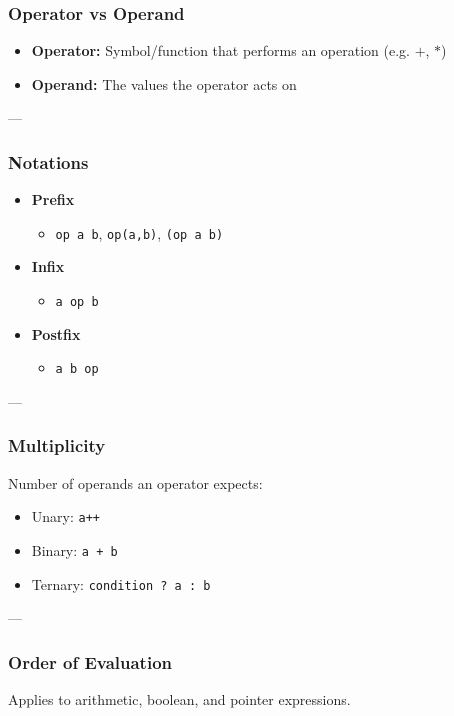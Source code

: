 \documentclass{article}
\begin{document}
\subsubsection{Operator vs Operand}
\begin{itemize}
  \item \textbf{Operator:} Symbol/function that performs an operation (e.g. $+$, $*$)
  \item \textbf{Operand:} The values the operator acts on
\end{itemize}

---

\subsubsection{Notations}

\begin{itemize}
  \item \textbf{Prefix}
  \begin{itemize}
    \item \texttt{op a b}, \texttt{op(a,b)}, \texttt{(op a b)}
  \end{itemize}
  
  \item \textbf{Infix}
  \begin{itemize}
    \item \texttt{a op b}
  \end{itemize}
  
  \item \textbf{Postfix}
  \begin{itemize}
    \item \texttt{a b op}
  \end{itemize}
\end{itemize}

---

\subsubsection{Multiplicity}
Number of operands an operator expects:
\begin{itemize}
  \item Unary: \texttt{a++}
  \item Binary: \texttt{a + b}
  \item Ternary: \texttt{condition ? a : b}
\end{itemize}

---

\subsubsection{Order of Evaluation}
Applies to arithmetic, boolean, and pointer expressions.
\end{document}
